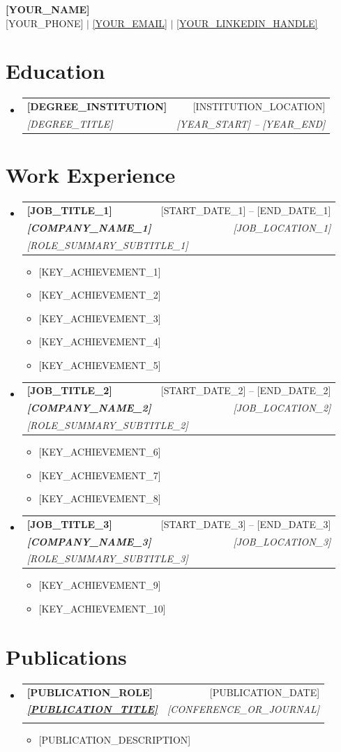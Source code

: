 \documentclass[letterpaper,11pt]{article}
\makeatletter
\newcommand{\resumeItem}[1]{
  \item\small{
    {#1 \vspace{-2pt}}
  }
}
\newcommand{\resumeSubheading}[4]{
  \vspace{-2pt}\item
    \begin{tabular*}{0.97\textwidth}[t]{l@{\extracolsep{\fill}}r}
      \textbf{#1} & #2 \\
      \textit{\small#3} & \textit{\small #4} \\
    \end{tabular*}\vspace{-7pt}
}
\newcommand{\workExSubheading}[5]{
  \vspace{-2pt}\item
    \begin{tabular*}{0.97\textwidth}[t]{l@{\extracolsep{\fill}}r}
      \textbf{#1} & #2 \\
      \textit{\small#3} & \textit{\small #4} \\
      \multicolumn{2}{l}{\sloppy \textit{\small #5}}
    \end{tabular*}\vspace{-7pt}
}
\newcommand{\resumeSubHeadingListStart}{\begin{itemize}[leftmargin=0.15in, label={}]}
\newcommand{\resumeSubHeadingListEnd}{\end{itemize}}
\newcommand{\resumeItemListStart}{\begin{itemize}}
\newcommand{\resumeItemListEnd}{\end{itemize}\vspace{-5pt}}
\makeatother
\begin{document}
\begin{center}
    \textbf{\Huge \scshape [YOUR_NAME]} \\ \vspace{1pt}
    \small [YOUR_PHONE] $|$ \href{mailto:[YOUR_EMAIL]}{\underline{[YOUR_EMAIL]}} $|$ 
    \href{https://[YOUR_LINKEDIN_URL]}{\underline{[YOUR_LINKEDIN_HANDLE]}}
\end{center}

\vspace{-10pt}
\section{Education}
  \resumeSubHeadingListStart
    \resumeSubheading
      {[DEGREE_INSTITUTION]}{[INSTITUTION_LOCATION]}
      {[DEGREE_TITLE]}{[YEAR_START] -- [YEAR_END]}
  \resumeSubHeadingListEnd

\section{Work Experience}
  \resumeSubHeadingListStart        
        
    \workExSubheading
      {[JOB_TITLE_1]}{[START_DATE_1] -- [END_DATE_1]}
      {\textbf{[COMPANY_NAME_1]}}{[JOB_LOCATION_1]}
      {[ROLE_SUMMARY_SUBTITLE_1]}
    
      \resumeItemListStart
        \resumeItem{[KEY_ACHIEVEMENT_1]}
        \resumeItem{[KEY_ACHIEVEMENT_2]}
        \resumeItem{[KEY_ACHIEVEMENT_3]}
        \resumeItem{[KEY_ACHIEVEMENT_4]}
        \resumeItem{[KEY_ACHIEVEMENT_5]}
      \resumeItemListEnd

    \workExSubheading
      {[JOB_TITLE_2]}{[START_DATE_2] -- [END_DATE_2]}
      {\textbf{[COMPANY_NAME_2]}}{[JOB_LOCATION_2]}
      {[ROLE_SUMMARY_SUBTITLE_2]}
      \resumeItemListStart
        \resumeItem{[KEY_ACHIEVEMENT_6]}
        \resumeItem{[KEY_ACHIEVEMENT_7]}
        \resumeItem{[KEY_ACHIEVEMENT_8]}
      \resumeItemListEnd

  \workExSubheading
  {[JOB_TITLE_3]}{[START_DATE_3] -- [END_DATE_3]}
  {\textbf{[COMPANY_NAME_3]}}{[JOB_LOCATION_3]}
  {[ROLE_SUMMARY_SUBTITLE_3]}
  \resumeItemListStart
    \resumeItem{[KEY_ACHIEVEMENT_9]}
    \resumeItem{[KEY_ACHIEVEMENT_10]}
  \resumeItemListEnd
    
\resumeSubHeadingListEnd

\section{Publications}
  \resumeSubHeadingListStart
    \workExSubheading
      {[PUBLICATION_ROLE]}{[PUBLICATION_DATE]}
      {\href{[PAPER_URL]}
      {\underline{\textbf{[PUBLICATION_TITLE]}}}}{[CONFERENCE_OR_JOURNAL]}
      {}
      \vspace{-14pt}
      \resumeItemListStart
        \resumeItem{[PUBLICATION_DESCRIPTION]}
      \resumeItemListEnd
  \resumeSubHeadingListEnd
\end{document}
